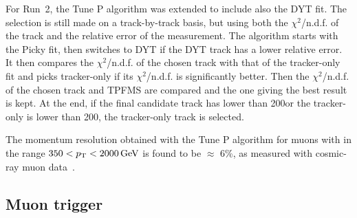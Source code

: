 For Run~2, the Tune P algorithm was extended to include also the DYT fit. The selection is still made on a track-by-track basis, but using both the $\chi^2$/n.d.f. of the track and the relative error of the \pt measurement. The algorithm starts with the Picky fit, then switches to DYT if the DYT track has a lower relative \pt error. It then compares the $\chi^2$/n.d.f. of the chosen track with that of the tracker-only fit and picks tracker-only if its $\chi^2$/n.d.f. is significantly better. Then the $\chi^2$/n.d.f. of the chosen track and TPFMS are compared and the one giving the best result is kept. At the end, if the final candidate track has \pt lower than 200\GeV or the tracker-only \pt is lower than 200\GeV, the tracker-only track is selected.%

The momentum resolution obtained with the Tune P algorithm for muons with \pt in the range $350 < p_{\mathrm{T}} < 2000\,\text{Ge\hspace{-.08em}V}$ is found to be $\approx$ 6\%, as measured with cosmic-ray muon data~\cite{Chatrchyan:2012xi,Radogna:2205870}.


\subsection{Muon trigger}\label{subsec:mutrigger}

